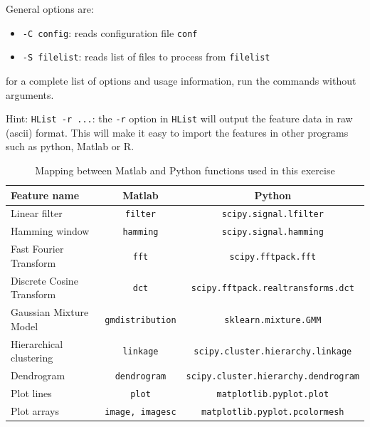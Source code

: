 \documentclass{nada-ten}
\begin{document}
General options are:
\begin{itemize}
\item \verb|-C config|: reads configuration file \verb|conf|
\item \verb|-S filelist|: reads list of files to process from \verb|filelist|
\end{itemize}
for a complete list of options and usage information, run the commands without arguments.

Hint: \verb|HList -r ...|: the \verb|-r| option in \verb|HList| will output the feature data in raw (ascii) format. This will make it easy to import the features in other programs such as python, Matlab or R.
%

\begin{table}
  \begin{tabular}{lcc}
    \hline
    Feature name           & Matlab & Python \\
    \hline
    Linear filter          & \texttt{filter} & \texttt{scipy.signal.lfilter} \\
    Hamming window         & \texttt{hamming} & \texttt{scipy.signal.hamming} \\
    Fast Fourier Transform & \texttt{fft} & \texttt{scipy.fftpack.fft} \\
    Discrete Cosine Transform & \texttt{dct} & \texttt{scipy.fftpack.realtransforms.dct} \\
    Gaussian Mixture Model & \texttt{gmdistribution} & \texttt{sklearn.mixture.GMM} \\
    Hierarchical clustering & \texttt{linkage} & \texttt{scipy.cluster.hierarchy.linkage} \\
    Dendrogram              & \texttt{dendrogram} & \texttt{scipy.cluster.hierarchy.dendrogram} \\
    Plot lines              & \texttt{plot} & \texttt{matplotlib.pyplot.plot} \\
    Plot arrays             & \texttt{image, imagesc} & \texttt{matplotlib.pyplot.pcolormesh} \\
    \hline
  \end{tabular}
  \caption{Mapping between Matlab and Python functions used in this exercise}
  \label{tab:matlabpython}
\end{table}
\end{document}
